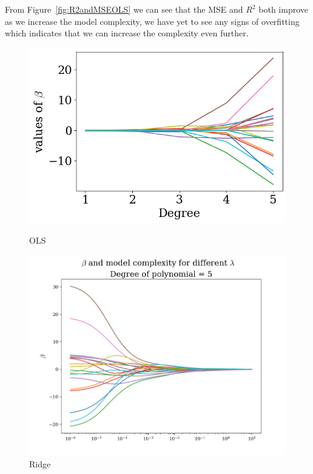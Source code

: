 \documentclass[twoside,11pt]{report}
\begin{document}
From Figure~\ref{fig:R2andMSEOLS} we can see that the MSE and $R^2$ both improve as we increase the model complexity, we have yet to see any signs of overfitting which indicates that we can increase the complexity even further.\\
\begin{figure}[!h]
\begin{minipage}[!t]{.48\linewidth}
    \begin{center}
        \includegraphics[width=1.0\textwidth]{../runsAndAdditions/betaOverOrderOLS.png}
        \caption{OLS}\label{fig:betaOverOrderOLS}
\end{center}
\end{minipage}
\hspace{4mm}
\begin{minipage}[!t]{.48\linewidth}
    \begin{center}
        \includegraphics[width=1.0\textwidth]{../runsAndAdditions/BetaOverLambdaRidge5.png}
        \caption{Ridge}\label{fig:betaOverLambdaRidge5}
    \end{center}
\end{minipage}
\end{figure}
\end{document}
